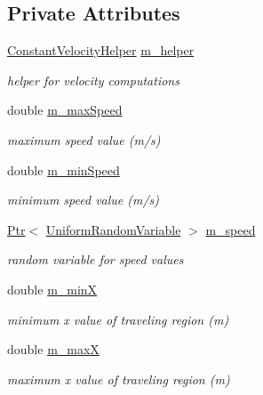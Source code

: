 \subsection*{Private Attributes}
\begin{DoxyCompactItemize}
\item 
\hyperlink{classns3_1_1ConstantVelocityHelper}{Constant\+Velocity\+Helper} \hyperlink{classns3_1_1SteadyStateRandomWaypointMobilityModel_ac32e974711c22cb50358e4e10109516c}{m\+\_\+helper}
\begin{DoxyCompactList}\small\item\em helper for velocity computations \end{DoxyCompactList}\item 
double \hyperlink{classns3_1_1SteadyStateRandomWaypointMobilityModel_a2e0b9a58625f4c4af3559b3362e3fad2}{m\+\_\+max\+Speed}
\begin{DoxyCompactList}\small\item\em maximum speed value (m/s) \end{DoxyCompactList}\item 
double \hyperlink{classns3_1_1SteadyStateRandomWaypointMobilityModel_a8a5945ad51a5e5698154b28c81928af9}{m\+\_\+min\+Speed}
\begin{DoxyCompactList}\small\item\em minimum speed value (m/s) \end{DoxyCompactList}\item 
\hyperlink{classns3_1_1Ptr}{Ptr}$<$ \hyperlink{classns3_1_1UniformRandomVariable}{Uniform\+Random\+Variable} $>$ \hyperlink{classns3_1_1SteadyStateRandomWaypointMobilityModel_a6bf20d5e0bbe779c2e7a8a820a9920c8}{m\+\_\+speed}
\begin{DoxyCompactList}\small\item\em random variable for speed values \end{DoxyCompactList}\item 
double \hyperlink{classns3_1_1SteadyStateRandomWaypointMobilityModel_a37f6b6cb1d31fce26b84b817831b1e24}{m\+\_\+minX}
\begin{DoxyCompactList}\small\item\em minimum x value of traveling region (m) \end{DoxyCompactList}\item 
double \hyperlink{classns3_1_1SteadyStateRandomWaypointMobilityModel_a7e404b5d33a31d542ad95fd857ea1651}{m\+\_\+maxX}
\begin{DoxyCompactList}\small\item\em maximum x value of traveling region (m) \end{DoxyCompactList}\item 

\end{DoxyCompactItemize}
